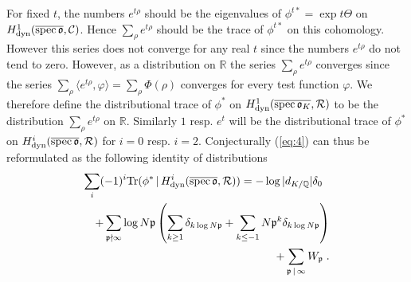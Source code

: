 \documentclass[11pt,leqno]{article}
\newcommand{\Q}{{\mathbb{Q}}}
\newcommand{\R}{{\mathbb{R}}}
\newcommand{\dyn}{\mathrm{dyn}}
\newcommand{\spec}{\mathrm{spec}\,}
\newcommand{\Tr}{\mathrm{Tr}}
\newcommand{\Ch}{{\cal C}}
\newcommand{\Rh}{{\cal R}}
\newcommand{\eo}{\mathfrak{o}}
\newcommand{\ep}{\mathfrak{p}}
\newcommand{\tei}{\, | \,}
\begin{document}
For fixed $t$, the numbers $e^{t\rho}$ should be the eigenvalues of $\phi^{t*} = \exp t\Theta$ on $H^1_{\dyn} (\overline{\spec \eo} , \Ch)$. Hence $\sum_{\rho} e^{t\rho}$ should be the trace of $\phi^{t*}$ on this cohomology. However this series does not converge for any real $t$ since the numbers $e^{t\rho}$ do not tend to zero. However, as a distribution on $\R$ the series $\sum_{\rho} e^{t\rho}$ converges since the series $\sum_{\rho} \langle e^{t\rho} , \varphi \rangle = \sum_{\rho} \Phi (\rho)$ converges for every test function $\varphi$. We therefore define the distributional trace of $\phi^*$ on $H^1_{\dyn} (\overline{\spec \eo_K} , \Rh)$ to be the distribution $\sum_{\rho} e^{t\rho}$ on $\R$. Similarly $1$ resp. $e^t$ will be the distributional trace of $\phi^*$ on $H^i_{\dyn} (\overline{\spec \eo} , \Rh)$ for $i = 0$ resp. $i = 2$. 
 Conjecturally (\ref{eq:4}) can thus be reformulated as the following identity of distributions
\begin{eqnarray}
  \label{eq:5}
  \lefteqn{\sum_i (-1)^i \Tr (\phi^{\ast} \tei H^i_{\dyn} ( \overline{\spec \eo}  , \Rh))  =  - \log |d_{K / \Q}| \delta_0 } \nonumber \\
& & + \sum_{\ep \nmid \infty} \log N \ep \left( \sum_{k \ge 1} \delta_{k \log N\ep} + \sum_{k \le -1} N \ep^k \delta_{k \log N\ep} \right) \nonumber \\
& & + \sum_{\ep \tei \infty} W_{\ep} \; .
\end{eqnarray}
\end{document}
